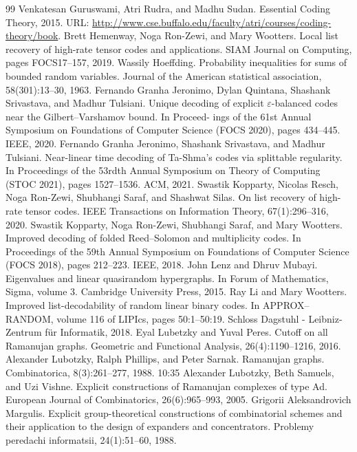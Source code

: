 \documentclass[10pt,a4paper]{article}
\begin{document}
\begin{thebibliography}{99}
 Venkatesan Guruswami, Atri Rudra, and Madhu Sudan. Essential Coding Theory, 2015. URL: \url{http://www.cse.buffalo.edu/faculty/atri/courses/coding-theory/book}.
 Brett Hemenway, Noga Ron-Zewi, and Mary Wootters. Local list recovery of high-rate tensor codes and applications. SIAM Journal on Computing, pages FOCS17–157, 2019.
 Wassily Hoeffding. Probability inequalities for sums of bounded random variables. Journal of the American statistical association, 58(301):13–30, 1963.
 Fernando Granha Jeronimo, Dylan Quintana, Shashank Srivastava, and Madhur Tulsiani. Unique decoding of explicit \(\varepsilon\)-balanced codes near the Gilbert–Varshamov bound. In Proceed- ings of the 61st Annual Symposium on Foundations of Computer Science (FOCS 2020), pages 434–445. IEEE, 2020.
 Fernando Granha Jeronimo, Shashank Srivastava, and Madhur Tulsiani. Near-linear time decoding of Ta-Shma’s codes via splittable regularity. In Proceedings of the 53rdth Annual Symposium on Theory of Computing (STOC 2021), pages 1527–1536. ACM, 2021.
 Swastik Kopparty, Nicolas Resch, Noga Ron-Zewi, Shubhangi Saraf, and Shashwat Silas. On list recovery of high-rate tensor codes. IEEE Transactions on Information Theory, 67(1):296–316, 2020.
 Swastik Kopparty, Noga Ron-Zewi, Shubhangi Saraf, and Mary Wootters. Improved decoding of folded Reed–Solomon and multiplicity codes. In Proceedings of the 59th Annual Symposium on Foundations of Computer Science (FOCS 2018), pages 212–223. IEEE, 2018.
 John Lenz and Dhruv Mubayi. Eigenvalues and linear quasirandom hypergraphs. In Forum of Mathematics, Sigma, volume 3. Cambridge University Press, 2015.
 Ray Li and Mary Wootters. Improved list-decodability of random linear binary codes. In APPROX–RANDOM, volume 116 of LIPIcs, pages 50:1–50:19. Schloss Dagstuhl - Leibniz- Zentrum für Informatik, 2018.
 Eyal Lubetzky and Yuval Peres. Cutoff on all Ramanujan graphs. Geometric and Functional Analysis, 26(4):1190–1216, 2016.
 Alexander Lubotzky, Ralph Phillips, and Peter Sarnak. Ramanujan graphs. Combinatorica, 8(3):261–277, 1988. 10:35
 Alexander Lubotzky, Beth Samuels, and Uzi Vishne. Explicit constructions of Ramanujan complexes of type Ad. European Journal of Combinatorics, 26(6):965–993, 2005.
 Grigorii Aleksandrovich Margulis. Explicit group-theoretical constructions of combinatorial schemes and their application to the design of expanders and concentrators. Problemy peredachi informatsii, 24(1):51–60, 1988.

\end{thebibliography}
\end{document}
